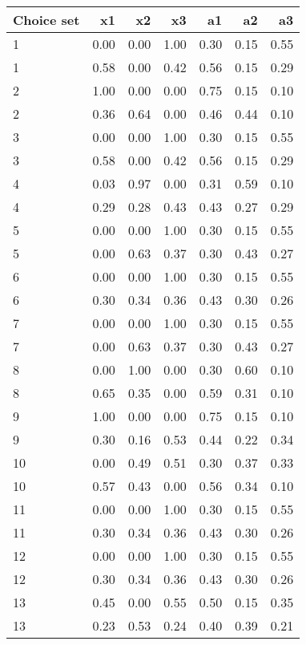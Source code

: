 \begin{table}[ht]
\centering
\begin{tabular}{lrrrrrr}
  \hline
Choice set & x1 & x2 & x3 & a1 & a2 & a3 \\ 
  \hline
1 & 0.00 & 0.00 & 1.00 & 0.30 & 0.15 & 0.55 \\ 
  1 & 0.58 & 0.00 & 0.42 & 0.56 & 0.15 & 0.29 \\ 
  2 & 1.00 & 0.00 & 0.00 & 0.75 & 0.15 & 0.10 \\ 
  2 & 0.36 & 0.64 & 0.00 & 0.46 & 0.44 & 0.10 \\ 
  3 & 0.00 & 0.00 & 1.00 & 0.30 & 0.15 & 0.55 \\ 
  3 & 0.58 & 0.00 & 0.42 & 0.56 & 0.15 & 0.29 \\ 
  4 & 0.03 & 0.97 & 0.00 & 0.31 & 0.59 & 0.10 \\ 
  4 & 0.29 & 0.28 & 0.43 & 0.43 & 0.27 & 0.29 \\ 
  5 & 0.00 & 0.00 & 1.00 & 0.30 & 0.15 & 0.55 \\ 
  5 & 0.00 & 0.63 & 0.37 & 0.30 & 0.43 & 0.27 \\ 
  6 & 0.00 & 0.00 & 1.00 & 0.30 & 0.15 & 0.55 \\ 
  6 & 0.30 & 0.34 & 0.36 & 0.43 & 0.30 & 0.26 \\ 
  7 & 0.00 & 0.00 & 1.00 & 0.30 & 0.15 & 0.55 \\ 
  7 & 0.00 & 0.63 & 0.37 & 0.30 & 0.43 & 0.27 \\ 
  8 & 0.00 & 1.00 & 0.00 & 0.30 & 0.60 & 0.10 \\ 
  8 & 0.65 & 0.35 & 0.00 & 0.59 & 0.31 & 0.10 \\ 
  9 & 1.00 & 0.00 & 0.00 & 0.75 & 0.15 & 0.10 \\ 
  9 & 0.30 & 0.16 & 0.53 & 0.44 & 0.22 & 0.34 \\ 
  10 & 0.00 & 0.49 & 0.51 & 0.30 & 0.37 & 0.33 \\ 
  10 & 0.57 & 0.43 & 0.00 & 0.56 & 0.34 & 0.10 \\ 
  11 & 0.00 & 0.00 & 1.00 & 0.30 & 0.15 & 0.55 \\ 
  11 & 0.30 & 0.34 & 0.36 & 0.43 & 0.30 & 0.26 \\ 
  12 & 0.00 & 0.00 & 1.00 & 0.30 & 0.15 & 0.55 \\ 
  12 & 0.30 & 0.34 & 0.36 & 0.43 & 0.30 & 0.26 \\ 
  13 & 0.45 & 0.00 & 0.55 & 0.50 & 0.15 & 0.35 \\ 
  13 & 0.23 & 0.53 & 0.24 & 0.40 & 0.39 & 0.21 \\ 

\end{tabular}
\end{table}

